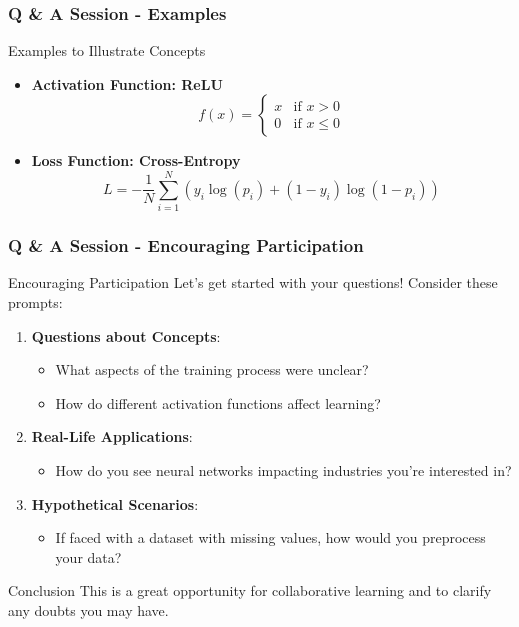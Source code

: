 \documentclass[aspectratio=169]{beamer}
\begin{document}
\begin{frame}[fragile]
    \frametitle{Q \& A Session - Examples}
    \begin{block}{Examples to Illustrate Concepts}
        \begin{itemize}
            \item \textbf{Activation Function: ReLU}
            \begin{equation}
                f(x) =
                \begin{cases}
                    x & \text{if } x > 0 \\
                    0 & \text{if } x \leq 0
                \end{cases}
            \end{equation}
            \item \textbf{Loss Function: Cross-Entropy}
            \begin{equation}
                L = -\frac{1}{N}\sum_{i=1}^{N} \left( y_i \log(p_i) + (1 - y_i) \log(1 - p_i) \right)
            \end{equation}
        \end{itemize}
    \end{block}
\end{frame}

\begin{frame}[fragile]
    \frametitle{Q \& A Session - Encouraging Participation}
    \begin{block}{Encouraging Participation}
        Let’s get started with your questions! Consider these prompts:
    \end{block}
    \begin{enumerate}
        \item \textbf{Questions about Concepts}:
        \begin{itemize}
            \item What aspects of the training process were unclear?
            \item How do different activation functions affect learning?
        \end{itemize}
        \item \textbf{Real-Life Applications}:
        \begin{itemize}
            \item How do you see neural networks impacting industries you're interested in?
        \end{itemize}
        \item \textbf{Hypothetical Scenarios}:
        \begin{itemize}
            \item If faced with a dataset with missing values, how would you preprocess your data?
        \end{itemize}
    \end{enumerate}
    \begin{block}{Conclusion}
        This is a great opportunity for collaborative learning and to clarify any doubts you may have.
    \end{block}
\end{frame}
\end{document}

